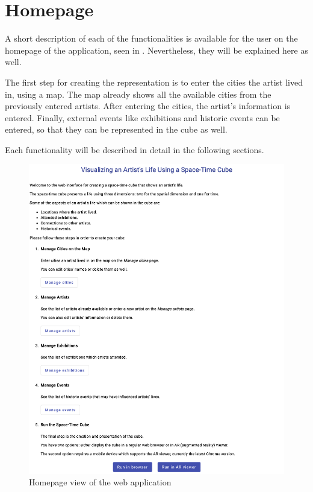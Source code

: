 \section{Homepage}\label{sec:homepage}
A short description of each of the functionalities is available for the user on the homepage of the application, seen in .
Nevertheless, they will be explained here as well.

The first step for creating the representation is to enter the cities the artist lived in, using a map. The map already shows all the available cities
from the previously entered artists. After entering the cities, the artist's information is entered. Finally, external events like exhibitions and historic events
can be entered, so that they can be represented in the cube as well.

Each functionality will be described in detail in the following sections.

\clearpage

\begin{figure}[hbt!]
    \begin{center}
        \includegraphics[width=\textwidth]{graphics/3-implementation/1}
    \end{center}
    \caption{Homepage view of the web application}
    \label{fig:figure3.1}
\end{figure}